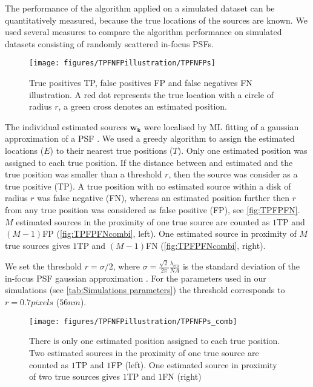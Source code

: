 The performance of the algorithm applied on a simulated dataset can be quantitatively measured, because the true locations of the sources are known. We used several measures to compare the algorithm performance on simulated datasets consisting of randomly scattered in-focus PSFs. 

\begin{figure}[!h]
	\centering
	\texttt{[image: figures/TPFNFPillustration/TPFNFPs]}
	\caption{True positives TP, false positives FP and false negatives FN illustration. A red dot represents the true location with a circle of radius $r$, a green cross denotes an estimated position.}
	\label{fig:TPFPFN}
\end{figure}

The individual estimated sources $\bm{w_{k}}$ were localised by ML fitting of a gaussian approximation of a PSF \cite{Zhang2007}. We used a greedy algorithm to assign the estimated locations ($E$) to their nearest true positions ($T$). Only one estimated position was assigned to each true position. If the distance between and estimated and the true position was smaller than a threshold $r$, then the source was consider as a true positive (TP). A true position with no estimated source within a disk of radius $r$ was false negative (FN), whereas an estimated position further then $r$ from any true position was considered as false positive (FP), see \autoref{fig:TPFPFN}. $M$ estimated sources in the proximity of one true source are counted as $1$TP and $(M-1)$FP (\autoref{fig:TPFPFNcombi}, left). One estimated source in proximity of $M$ true sources gives $1$TP and $(M-1)$FN (\autoref{fig:TPFPFNcombi}, right).

We set the threshold $r=\sigma/2$, where $\sigma=\frac{\sqrt{2}}{2\pi}\frac{\lambda_{em}}{NA}$ is the standard deviation of the in-focus PSF gaussian approximation \cite{Zhang2007}. For the parameters used in our simulations (see \autoref{tab:Simulations parameters}) the threshold corresponds to $r=0.7\unit{pixels}$ ($56\unit{nm}$). 

\begin{figure}[!h]
	\centering
	\texttt{[image: figures/TPFNFPillustration/TPFNFPs\_comb]}
	\caption{There is only one estimated position assigned to each true position. Two estimated sources in the proximity of one true source are counted as $1$TP and $1$FP (left). One estimated source in proximity of two true sources gives $1$TP and $1$FN (right)}
	\label{fig:TPFPFNcombi}
\end{figure}

